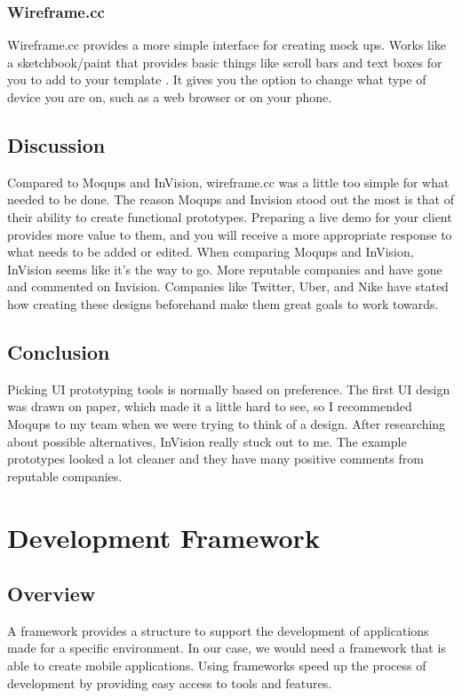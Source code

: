 \documentclass[onecolumn, draftclsnofoot,10pt, compsoc]{IEEEtran}
\begin{document}
\subsubsection{Wireframe.cc}

Wireframe.cc provides a more simple interface for creating mock ups. Works like a sketchbook/paint that provides basic things like scroll bars and text boxes for you to add to your template \cite{wireframe}. It gives you the option to change what type of device you are on, such as a web browser or on your phone.  

\subsection{Discussion}

Compared to Moqups and InVision, wireframe.cc was a little too simple for what needed to be done. The reason Moqups and Invision stood out the most is that of their ability to create functional prototypes. Preparing a live demo for your client provides more value to them, and you will receive a more appropriate response to what needs to be added or edited. When comparing Moqups and InVision, InVision seems like it's the way to go. More reputable companies and have gone and commented on Invision. Companies like Twitter, Uber, and Nike have stated how creating these designs beforehand make them great goals to work towards. 

\subsection{Conclusion}

Picking UI prototyping tools is normally based on preference. The first UI design was drawn on paper, which made it a little hard to see, so I recommended Moqups to my team when we were trying to think of a design. After researching about possible alternatives, InVision really stuck out to me. The example prototypes looked a lot cleaner and they have many positive comments from reputable companies. 

\clearpage
\section{Development Framework}
\subsection{Overview}

A framework provides a structure to support the development of applications made for a specific environment. In our case, we would need a framework that is able to create mobile applications. Using frameworks speed up the process of development by providing easy access to tools and features. 
\end{document}
